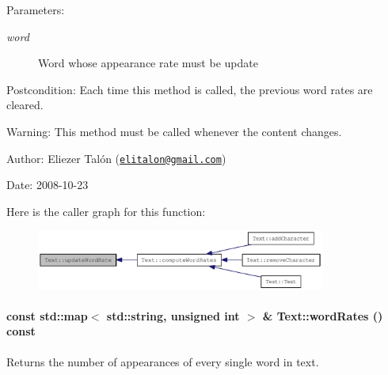 \begin{Desc}
\item[Parameters:]
\begin{description}
\item[{\em word}]Word whose appearance rate must be update\end{description}
\end{Desc}
\begin{Desc}
\item[Postcondition:]Each time this method is called, the previous word rates are cleared.\end{Desc}
\begin{Desc}
\item[Warning:]This method must be called whenever the content changes.\end{Desc}
\begin{Desc}
\item[Author:]Eliezer Talón (\href{mailto:elitalon@gmail.com}{\tt elitalon@gmail.com}) \end{Desc}
\begin{Desc}
\item[Date:]2008-10-23 \end{Desc}


Here is the caller graph for this function:\nopagebreak
\begin{figure}[H]
\begin{center}
\leavevmode
\includegraphics[width=269pt]{class_text_5ab8f9bfa566de537a167991fe10eff5_icgraph}
\end{center}
\end{figure}
\hypertarget{class_text_f1588ae161a4c4894b2ce1a1d29ebc22}{
\paragraph[{wordRates}]{\setlength{\rightskip}{0pt plus 5cm}const std::map$<$ std::string, unsigned int $>$ \& Text::wordRates () const}\hfill}
\label{class_text_f1588ae161a4c4894b2ce1a1d29ebc22}


Returns the number of appearances of every single word in text. 

